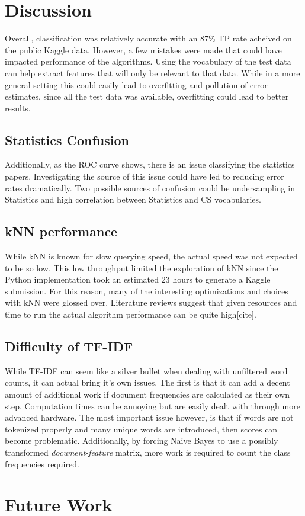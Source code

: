 \documentclass[10pt,twocolumn]{article}
\begin{document}
\section*{Discussion}

Overall, classification was relatively accurate with an $87\%$ TP rate acheived on the public Kaggle data. However, a few mistakes were made that could have impacted performance of the algorithms. Using the vocabulary of the test data can help extract features that will only be relevant to that data.  While in a more general setting this could easily lead to overfitting and pollution of error estimates, since all the test data was available, overfitting could lead to better results. 

\subsection*{Statistics Confusion}

Additionally, as the ROC curve shows, there is an issue classifying the statistics papers. Investigating the source of this issue could have led to reducing error rates dramatically. Two possible sources of confusion could be undersampling in Statistics and high correlation between Statistics and CS vocabularies.

\subsection*{kNN performance}

While kNN is known for slow querying speed, the actual speed was not expected to be so low. This low throughput limited the exploration of kNN since the Python implementation took an estimated 23 hours to generate a Kaggle submission. For this reason, many of the interesting optimizations and choices with kNN were glossed over. Literature reviews suggest that given resources and time to run the actual algorithm performance can be quite high[cite].

\subsection*{Difficulty of TF-IDF}

While TF-IDF can seem like a silver bullet when dealing with unfiltered word counts, it can actual bring it's own issues. The first is that it can add a decent amount of additional work if document frequencies are calculated as their own step. Computation times can be annoying but are easily dealt with through more advanced hardware. The most important issue however, is that if words are not tokenized properly and many unique words are introduced, then scores can become problematic. Additionally, by forcing Naive Bayes to use a possibly transformed \emph{document-feature} matrix, more work is required to count the class frequencies required.

\section*{Future Work}
\end{document}
